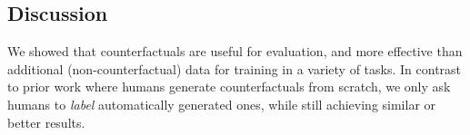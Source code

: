 












\subsection{Discussion}
\label{subsec:label_efficiency}
We showed that \sysname counterfactuals are useful for evaluation, and more effective than additional (non-counterfactual) data for training in a variety of tasks. 
In contrast to prior work where humans generate counterfactuals from scratch, we only ask humans to \emph{label} automatically generated ones, while still achieving similar or better results.

